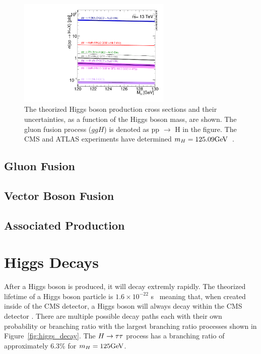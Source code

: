 \begin{figure}[htbp]
\centering
     \includegraphics[width=0.65\textwidth]{phenomology_of_processes/plots/plot_13tev_H_sqrt.pdf}
     \caption{
The theorized Higgs boson production cross sections and their uncertainties,
as a function of the Higgs boson mass, are shown. The gluon fusion process ($ggH$)
is denoted as pp $\to$ H in the figure.
The CMS and ATLAS experiments have determined $m_{H} = 125.09\mathrm{GeV}$~\cite{Aad:2015zhl}.
     }
     \label{fig:higgs_production}
\end{figure}


\subsection{Gluon Fusion}

\subsection{Vector Boson Fusion}

\subsection{Associated Production}

\section{Higgs Decays}

After a Higgs boson is produced, it will decay extremly rapidly. The theorized lifetime of a Higgs
boson particle is $1.6 \times 10^{-22}$ s~\cite{Dittmaier:2012vm} meaning that, when created
inside of the CMS detector, a Higgs boson will always decay
within the CMS detector . There are multiple possible decay
paths each with their own probability or branching ratio with the largest branching ratio
processes shown in Figure~\ref{fig:higgs_decay}. The $H\to\tau\tau$ process has a branching
ratio of approximately 6.3\% for $m_{H} = 125\mathrm{GeV}$.


